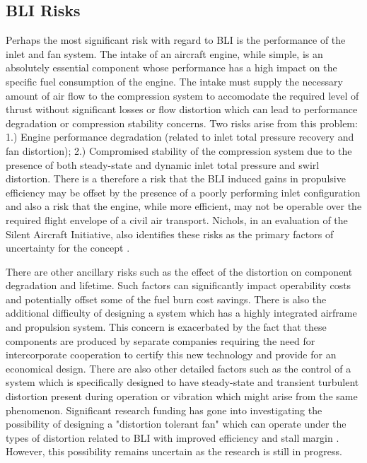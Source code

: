 \subsection{BLI Risks}
Perhaps the most significant risk with regard to BLI is the performance of the inlet and fan system.  The intake of an aircraft engine, while simple, is an absolutely essential component whose performance has a high impact on the specific fuel consumption of the engine.  The intake must supply the necessary amount of air flow to the compression system to accomodate the required level of thrust without significant losses or flow distortion which can lead to performance degradation or compression stability concerns. Two risks arise from this problem: 1.)  Engine performance degradation (related to inlet total pressure recovery and fan distortion); 2.) Compromised stability of the compression system due to the presence of both steady-state and dynamic inlet total pressure and swirl distortion.  There is a therefore a risk that the BLI induced gains in propulsive efficiency may be offset by the presence of a poorly performing inlet configuration and also a risk that the engine, while more efficient, may not be operable over the required flight envelope of a civil air transport. Nichols, in an evaluation of the Silent Aircraft Initiative, also identifies these risks as the primary factors of uncertainty for the concept \cite{Nickol2008}.  

There are other ancillary risks such as the effect of the distortion on component degradation and lifetime. Such factors can significantly impact operability costs and potentially offset some of the fuel burn cost savings. There is also the additional difficulty of designing a system which has a highly integrated airframe and propulsion system. This concern is exacerbated by the fact that these components are produced by separate companies requiring the need for intercorporate cooperation to certify this new technology and provide for an economical design. There are also other detailed factors such as the control of a system which is specifically designed to have steady-state and transient turbulent distortion present during operation or vibration which might arise from the same phenomenon. Significant research funding has gone into investigating the possibility of designing a "distortion tolerant fan" which can operate under the types of distortion related to BLI with improved efficiency and stall margin \cite{Florea2013}. However, this possibility remains uncertain as the research is still in progress.

